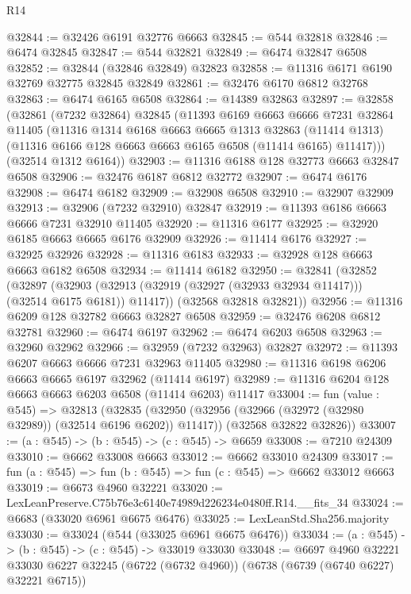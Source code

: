 \begin{lexlean}{R14}
\begin{coremodule}
@32844 := @32426 @6191 @32776 @6663
@32845 := @544 @32818
@32846 := @6474 @32845
@32847 := @544 @32821
@32849 := @6474 @32847 @6508
@32852 := @32844 (@32846 @32849) @32823
@32858 := @11316 @6171 @6190 @32769 @32775 @32845 @32849
@32861 := @32476 @6170 @6812 @32768
@32863 := @6474 @6165 @6508
@32864 := @14389 @32863
@32897 := @32858
    (@32861
      (@7232 @32864)
      @32845
      (@11393
        @6169
        @6663
        @6666
        @7231
        @32864
        @11405
        (@11316
          @1314
          @6168
          @6663
          @6665
          @1313
          @32863
          (@11414 @1313)
          (@11316 @6166 @128 @6663 @6663 @6165 @6508 (@11414 @6165) @11417)))
      (@32514 @1312 @6164))
@32903 := @11316 @6188 @128 @32773 @6663 @32847 @6508
@32906 := @32476 @6187 @6812 @32772
@32907 := @6474 @6176
@32908 := @6474 @6182
@32909 := @32908 @6508
@32910 := @32907 @32909
@32913 := @32906 (@7232 @32910) @32847
@32919 := @11393 @6186 @6663 @6666 @7231 @32910 @11405
@32920 := @11316 @6177
@32925 := @32920 @6185 @6663 @6665 @6176 @32909
@32926 := @11414 @6176
@32927 := @32925 @32926
@32928 := @11316 @6183
@32933 := @32928 @128 @6663 @6663 @6182 @6508
@32934 := @11414 @6182
@32950 := @32841
    (@32852
      (@32897
        (@32903 (@32913 (@32919 (@32927 (@32933 @32934 @11417))) (@32514 @6175 @6181)) @11417))
      (@32568 @32818 @32821))
@32956 := @11316 @6209 @128 @32782 @6663 @32827 @6508
@32959 := @32476 @6208 @6812 @32781
@32960 := @6474 @6197
@32962 := @6474 @6203 @6508
@32963 := @32960 @32962
@32966 := @32959 (@7232 @32963) @32827
@32972 := @11393 @6207 @6663 @6666 @7231 @32963 @11405
@32980 := @11316 @6198 @6206 @6663 @6665 @6197 @32962 (@11414 @6197)
@32989 := @11316 @6204 @128 @6663 @6663 @6203 @6508 (@11414 @6203) @11417
@33004 := fun (value : @545) =>
  @32813
    (@32835
      (@32950 (@32956 (@32966 (@32972 (@32980 @32989)) (@32514 @6196 @6202)) @11417))
      (@32568 @32822 @32826))
@33007 := (a : @545) -> (b : @545) -> (c : @545) -> @6659
@33008 := @7210 @24309
@33010 := @6662 @33008 @6663
@33012 := @6662 @33010 @24309
@33017 := fun (a : @545) => fun (b : @545) => fun (c : @545) => @6662 @33012 @6663
@33019 := @6673 @4960 @32221
@33020 := LexLeanPreserve.C75b76e3c6140e74989d226234e0480ff.R14.__fits_34
@33024 := @6683 (@33020 @6961 @6675 @6476)
@33025 := LexLeanStd.Sha256.majority
@33030 := @33024 (@544 (@33025 @6961 @6675 @6476))
@33034 := (a : @545) -> (b : @545) -> (c : @545) -> @33019 @33030
@33048 := @6697
    @4960
    @32221
    @33030
    @6227
    @32245
    (@6722 (@6732 @4960))
    (@6738 (@6739 (@6740 @6227) @32221 @6715))

\end{coremodule}
\end{lexlean}
